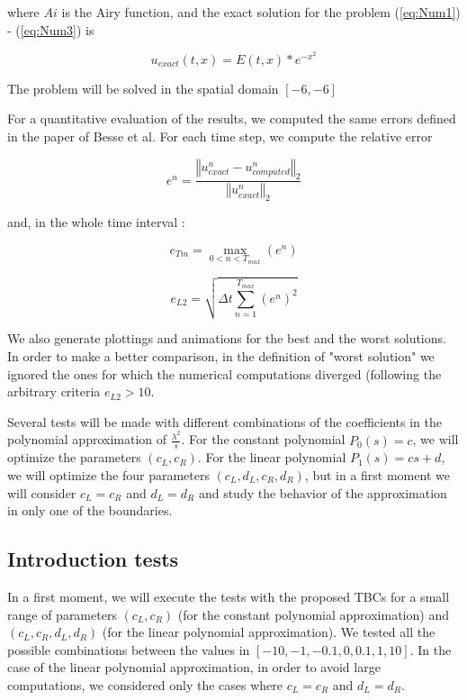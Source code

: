\noindent where $Ai$ is the Airy function, and the exact solution for the problem (\ref{eq:Num1}) - (\ref{eq:Num3}) is

\begin{equation}
    u_{exact}(t,x) = E(t,x) * e^{-x^2}
\end{equation}

\indent The problem will be solved in the spatial domain $[-6,-6]$

\indent For a quantitative evaluation of the results, we computed the same errors defined in the paper of Besse et al. For each time step, we compute the relative error

$$e^n = \frac{\left\Vert u_{exact}^n - u_{computed}^n\right\Vert_2}{\left\Vert u_{exact}^n\right\Vert_2}$$

\noindent and, in the whole time interval :

$$ e_{Tm} = \max\limits_{0 < n < T_{max}} (e^n) $$

$$ e_{L2} = \sqrt{ \Delta t \sum_{n=1}^{T_{max}} (e^n)^2 } $$

\indent We also generate plottings and animations for the best and the worst solutions. In order to make a better comparison, in the definition of "worst solution" we ignored the ones for which the numerical computations diverged (following the arbitrary criteria $e_{L2} > 10$.

\indent Several tests will be made with different combinations of the coefficients in the polynomial approximation of $\frac{\lambda^2}{s}$. For the constant polynomial $P_0(s) = c$, we will optimize the parameters $(c_L,c_R)$. For the linear polynomial $P_1(s) = cs+d$, we will optimize the four parameters $(c_L,d_L,c_R,d_R)$, but in a first moment we will consider $c_L = c_R$ and $d_L = d_R$ and study the behavior of the approximation in only one of the boundaries.


\subsection{Introduction tests}

\indent In a first moment, we will execute the tests with the proposed TBCs for a small range of parameters $(c_L,c_R)$ (for the constant polynomial approximation) and $(c_L,c_R,d_L,d_R)$ (for the linear polynomial approximation).  We tested all the possible combinations between the values in $[-10,-1,-0.1,0,0.1,1,10]$. In the case of the linear polynomial approximation, in order to avoid large computations, we considered only the cases where $c_L = c_R$ and $d_L = d_R$.

